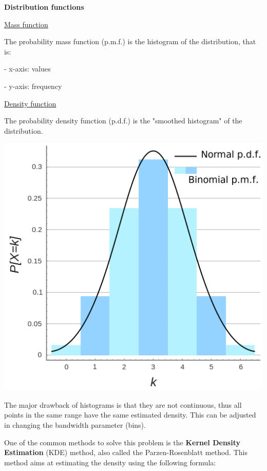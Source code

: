 {\fontsize{12pt}{22pt} \textbf{Distribution functions}\par}

\vspace{5mm}

\underline{Mass function}

The probability mass function (p.m.f.) is the histogram of the distribution, that is:

- x-axis: values

- y-axis: frequency

\vspace{5mm}

\underline{Density function}

The probability density function (p.d.f.) is the "smoothed histogram" of the distribution.

\vspace{5mm}

\begin{center}
\includegraphics[scale=0.15]{mass_density_functions.png}
\end{center}

The major drawback of histograms is that they are not continuous, thus all points in the same range have the same estimated density. This can be adjusted in changing the bandwidth parameter (bins).

One of the common methods to solve this problem is the \textbf{Kernel Density Estimation} (KDE) method, also called the Parzen-Rosenblatt method. This method aims at estimating the density using the following formula:

